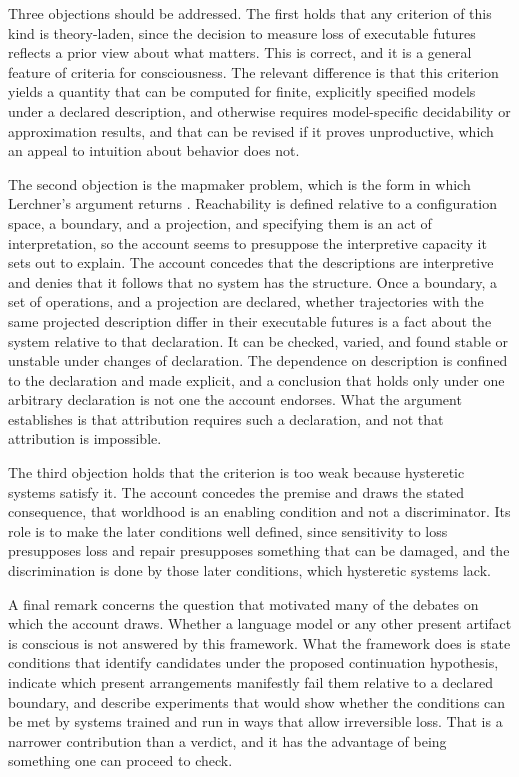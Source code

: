 \documentclass[11pt]{article}
\theoremstyle{definition}
\theoremstyle{plain}
\theoremstyle{remark}
\begin{document}
Three objections should be addressed. The first holds that any criterion of this kind is theory-laden, since the decision to measure loss of executable futures reflects a prior view about what matters. This is correct, and it is a general feature of criteria for consciousness. The relevant difference is that this criterion yields a quantity that can be computed for finite, explicitly specified models under a declared description, and otherwise requires model-specific decidability or approximation results, and that can be revised if it proves unproductive, which an appeal to intuition about behavior does not.

The second objection is the mapmaker problem, which is the form in which Lerchner's argument returns \cite{lerchner2026}. Reachability is defined relative to a configuration space, a boundary, and a projection, and specifying them is an act of interpretation, so the account seems to presuppose the interpretive capacity it sets out to explain. The account concedes that the descriptions are interpretive and denies that it follows that no system has the structure. Once a boundary, a set of operations, and a projection are declared, whether trajectories with the same projected description differ in their executable futures is a fact about the system relative to that declaration. It can be checked, varied, and found stable or unstable under changes of declaration. The dependence on description is confined to the declaration and made explicit, and a conclusion that holds only under one arbitrary declaration is not one the account endorses. What the argument establishes is that attribution requires such a declaration, and not that attribution is impossible.

The third objection holds that the criterion is too weak because hysteretic systems satisfy it. The account concedes the premise and draws the stated consequence, that worldhood is an enabling condition and not a discriminator. Its role is to make the later conditions well defined, since sensitivity to loss presupposes loss and repair presupposes something that can be damaged, and the discrimination is done by those later conditions, which hysteretic systems lack.

A final remark concerns the question that motivated many of the debates on which the account draws. Whether a language model or any other present artifact is conscious is not answered by this framework. What the framework does is state conditions that identify candidates under the proposed continuation hypothesis, indicate which present arrangements manifestly fail them relative to a declared boundary, and describe experiments that would show whether the conditions can be met by systems trained and run in ways that allow irreversible loss. That is a narrower contribution than a verdict, and it has the advantage of being something one can proceed to check.
\end{document}
